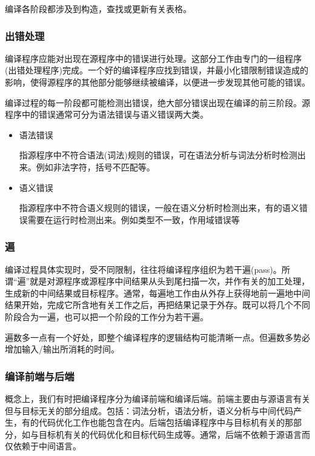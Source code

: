 编译各阶段都涉及到构造，查找或更新有关表格。

\subsubsection{出错处理}

编译程序应能对出现在源程序中的错误进行处理。这部分工作由专门的一组程序(出错处理程序)完成。一个好的编译程序应找到错误，并最小化错限制错误造成的影响，使得源程序的其他部分能够继续被编译，以便进一步发现其他可能的错误。

编译过程的每一阶段都可能检测出错误，绝大部分错误出现在编译的前三阶段。源程序中的错误通常可分为语法错误与语义错误两大类。

\begin{itemize}
    \item 语法错误 
    
    指源程序中不符合语法(词法)规则的错误，可在语法分析与词法分析时检测出来。例如非法字符，括号不匹配等。
    \item 语义错误
    
    指源程序中不符合语义规则的错误，一般在语义分析时检测出来，有的语义错误需要在运行时检测出来。例如类型不一致，作用域错误等
\end{itemize}

\subsubsection{遍}

编译过程具体实现时，受不同限制，往往将编译程序组织为若干遍(pass)。所谓``遍''就是对源程序或源程序中间结果从头到尾扫描一次，并作有关的加工处理，生成新的中间结果或目标程序。通常，每遍地工作由从外存上获得地前一遍地中间结果开始，完成它所含地有关工作之后，再把结果记录于外存。既可以将几个不同阶段合为一遍，也可以把一个阶段的工作分为若干遍。

遍数多一点有一个好处，即整个编译程序的逻辑结构可能清晰一点。但遍数多势必增加输入/输出所消耗的时间。

\subsubsection{编译前端与后端}

概念上，我们有时把编译程序分为编译前端和编译后端。前端主要由与源语言有关但与目标无关的部分组成。包括：词法分析，语法分析，语义分析与中间代码产生，有的代码优化工作也能包含在内。后端包括编译程序中与目标机有关的那部分，如与目标机有关的代码优化和目标代码生成等。通常，后端不依赖于源语言而仅依赖于中间语言。

